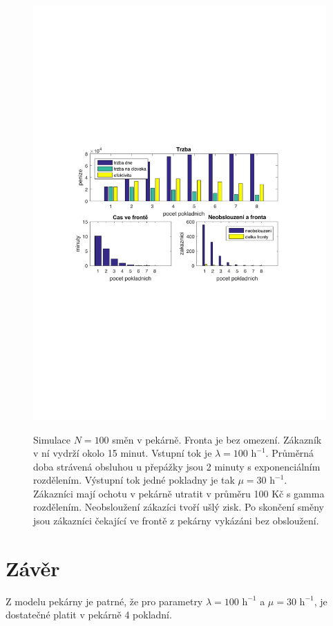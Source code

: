 \documentclass[a4paper,12pt]{article}
\begin{document}
\begin{figure}[h]
\centering
\includegraphics[width=0.99\columnwidth]{timeout.pdf}
\label{fig:maxFronta}
\caption{Simulace \(N=100\) směn v pekárně. Fronta je bez omezení. Zákazník v ní vydrží okolo 15 minut.
Vstupní tok je \(\lambda = 100 \mbox{~h}^{-1}\). 
Průměrná doba strávená obsluhou u přepážky jsou 2 minuty s exponenciálním rozdělením. Výstupní tok 
jedné pokladny je tak \(\mu = 30 \mbox{~h}^{-1}\). Zákazníci mají ochotu v pekárně utratit v průměru 100 Kč s gamma rozdělením. 
Neobsloužení zákazíci tvoří ušlý zisk. Po skončení směny jsou zákazníci čekající ve frontě z pekárny vykázáni bez obsloužení.}
\end{figure}

\section{Závěr}
Z modelu pekárny je patrné, že pro parametry \(\lambda = 100 \mbox{~h}^{-1}\) a \(\mu = 30 \mbox{~h}^{-1}\), 
je dostatečné platit v pekárně 4 pokladní. 
\end{document}
